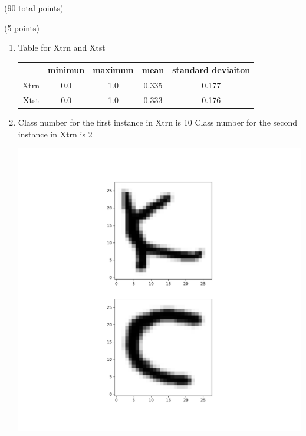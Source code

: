 \documentclass[12pt]{article}
\begin{document}
\begin{question}{(90 total points) \qTwoTitle}
\begin{subquestion}{(5 points)
  }
  \begin{answerbox}{0.55\textheight}
    \begin{enumerate}
    \item Table for Xtrn and Xtst
    \begin{center}
        \begin{tabular}{c|c|c|c|c} \hline
             &minimun&maximum&mean&standard deviaiton \\ \hline
             Xtrn&0.0&1.0&0.335&0.177 \\ \hline
             Xtst&0.0&1.0&0.333&0.176 \\ \hline
        \end{tabular}
    \end{center}
    \item Class number for the first instance in Xtrn is 10
      Class number for the second instance in Xtrn is 2
      \begin{center}
      \includegraphics[scale=0.4]{Xtrn[1].pdf}
      \end{center}
    \end{enumerate}
  \end{answerbox}
  


\end{subquestion}


\end{question}
\end{document}
